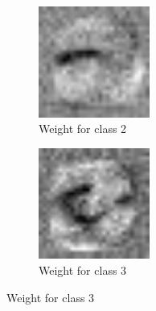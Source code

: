 \begin{figure}
    \begin{subfigure}
        \centering
        \includegraphics[width=0.4\textwidth]{figures/weights/class_2_weight_image.jpg}
        \caption{Weight for class 2}
        \label{fig:class_2_weight}
    \end{subfigure}
    \begin{subfigure}
        \centering
        \includegraphics[width=0.4\textwidth]{figures/weights/class_3_weight_image.jpg}
        \caption{Weight for class 3}
        \label{fig:class_3_weight}
    \end{subfigure}

    \newpage


\end{figure}
